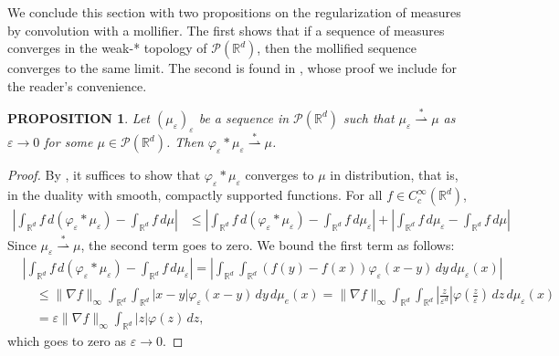 \documentclass[11pt,leqno]{amsart}
\newtheorem{prop}[thm]{PROPOSITION}
\theoremstyle{definition}
\newcommand{\R}{{\mathord{\mathbb R}}}
\newcommand{\Rd}{{\mathord{\mathbb R}^d}}
\newcommand{\grad}{\nabla}
\newcommand{\wsto}{\stackrel{*}{\rightharpoonup}}
\def\P{{\mathcal P}}
\def\e{\varepsilon}
\newcommand{\ird}{\int_{\mathord{\mathbb R}^d}}
\begin{document}

We conclude this section with two propositions on the regularization of measures by convolution with a mollifier. The first shows that if a sequence of measures converges in the weak-* topology of $\P(\Rd)$, then the mollified sequence converges to the same limit. The second is found in \cite{LionsMasGallic}, whose proof we include for the reader's convenience.

\begin{prop} \label{narrow convergence mollified sequence}
	Let $(\mu_\e)_\e$ be a sequence in $\P(\R^d)$ such that $\mu_\e \wsto \mu$ as $\e\to0$ for some $\mu\in\P(\R^d)$. Then $\varphi_\e *\mu_\e \wsto \mu$.
\end{prop}

\begin{proof}
	By \cite[Remark 5.1.6]{AGS}, it suffices to show that $\varphi_\e *\mu_\e$ converges to $\mu$ in distribution, that is, in the duality with smooth, compactly supported functions. For all $f \in C^\infty_c(\Rd)$,
\begin{align*}
	\left| \ird f \,d (\varphi_\e *\mu_\e) - \ird f \,d\mu \right| &\leq \left| \ird f \,d (\varphi_\e *\mu_\e) - \ird f \,d\mu_\e \right| + \left| \ird f \,d\mu_\e - \ird f \,d\mu \right|
\end{align*}
Since $\mu_\e \wsto \mu$, the second term goes to zero. We bound the first term as follows:
\begin{align*}
& \left| \ird f \,d (\varphi_\e *\mu_\e) - \ird f \,d\mu_\e \right| = \left| \ird\ird (f(y) - f(x)) \varphi_\e(x-y)\,dy \,d \mu_\e(x) \right| \\
 &\quad \leq \|\grad f\|_\infty \ird\ird |x-y| \varphi_\e(x-y) \,dy \,d\mu_e(x) = \|\grad f\|_\infty \ird\ird \left| \frac{z}{\e^d} \right| \varphi \left(\frac{z}{\e} \right) \,dz \,d\mu_\e(x) \\
 &\quad = \e \|\grad f\|_\infty \ird |z | \varphi(z) \,dz ,
\end{align*}
which goes to zero as $\e \to 0$.
\end{proof}
\end{document}
